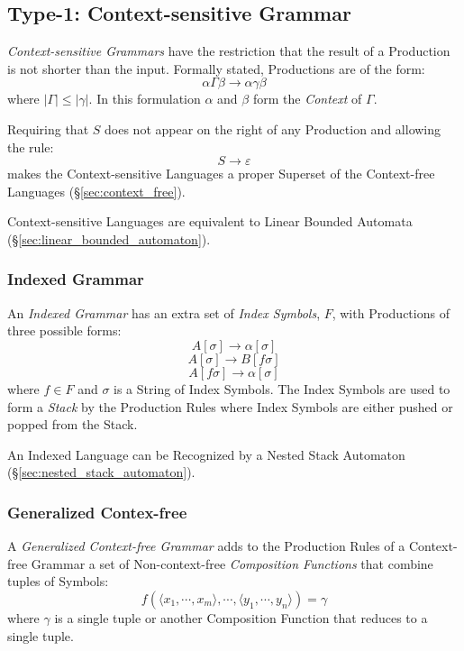 \subsection{Type-1: Context-sensitive Grammar}
\label{sec:context_sensitive}

\emph{Context-sensitive Grammars} have the restriction that the result of a
Production is not shorter than the input. Formally stated, Productions are of
the form:
\[
  \alpha \Gamma \beta \rightarrow \alpha \gamma \beta
\]
where $|\Gamma| \leq |\gamma|$. In this formulation $\alpha$ and $\beta$ form
the \emph{Context} of $\Gamma$.

Requiring that $S$ does not appear on the right of any Production and allowing
the rule:
\[
  S \rightarrow \varepsilon
\]
makes the Context-sensitive Languages a proper Superset of the Context-free
Languages (\S\ref{sec:context_free}).

Context-sensitive Languages are equivalent to Linear Bounded Automata
(\S\ref{sec:linear_bounded_automaton}).



\subsubsection{Indexed Grammar}\label{subsubsection:indexed_grammar}

An \emph{Indexed Grammar} has an extra set of \emph{Index Symbols}, $F$, with
Productions of three possible forms:
\[
  A[\sigma] \rightarrow \alpha[\sigma]
\]\[
  A[\sigma] \rightarrow B[f\sigma]
\]\[
  A[f\sigma] \rightarrow \alpha[\sigma]
\]
where $f \in F$ and $\sigma$ is a String of Index Symbols. The Index Symbols are
used to form a \emph{Stack} by the Production Rules where Index Symbols are
either pushed or popped from the Stack.

An Indexed Language can be Recognized by a Nested Stack Automaton
(\S\ref{sec:nested_stack_automaton}).\cite{aho69}



\subsubsection{Generalized Contex-free}
\label{sec:generalized_context_free}

A \emph{Generalized Context-free Grammar} adds to the Production Rules of a
Context-free Grammar a set of Non-context-free \emph{Composition Functions} that
combine tuples of Symbols:
\[
  f(\langle x_1,\cdots,x_m\rangle,\cdots,\langle
  y_1,\cdots,y_n\rangle)=\gamma
\]
where $\gamma$ is a single tuple or another Composition Function that reduces to
a single tuple.

